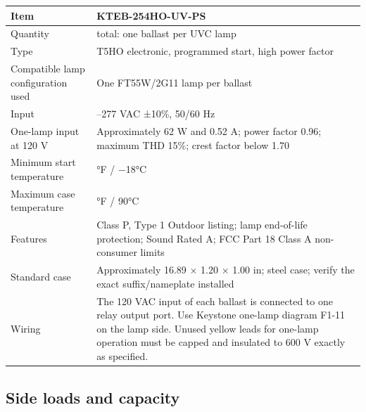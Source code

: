 \documentclass[
  10pt,
  letterpaper,
  openany]{report}
\newcounter{none} %
\begin{document}
{\def\LTcaptype{none} %
\begin{longtable}[]{@{}
  >{\raggedright\arraybackslash}p{}
  >{\raggedright\arraybackslash}p{}@{}}
\toprule\noalign{}
\begin{minipage}[b]{\linewidth}\raggedright
Item
\end{minipage} & \begin{minipage}[b]{\linewidth}\raggedright
KTEB-254HO-UV-PS
\end{minipage} \\
\midrule\noalign{}
\endhead
\bottomrule\noalign{}
\endlastfoot
Quantity & 4 total: one ballast per UVC lamp \\
Type & T5HO electronic, programmed start, high power factor \\
Compatible lamp configuration used & One FT55W/2G11 lamp per ballast \\
Input & 120--277 VAC ±10\%, 50/60 Hz \\
One-lamp input at 120 V & Approximately 62 W and 0.52 A; power factor
0.96; maximum THD 15\%; crest factor below 1.70 \\
Minimum start temperature & 0°F / −18°C \\
Maximum case temperature & 194°F / 90°C \\
Features & Class P, Type 1 Outdoor listing; lamp end-of-life protection;
Sound Rated A; FCC Part 18 Class A non-consumer limits \\
Standard case & Approximately 16.89 × 1.20 × 1.00 in; steel case; verify
the exact suffix/nameplate installed \\
Wiring & The 120 VAC input of each ballast is connected to one relay
output port. Use Keystone one-lamp diagram F1-11 on the lamp side.
Unused yellow leads for one-lamp operation must be capped and insulated
to 600 V exactly as specified. \\
\end{longtable}
}

\subsection{Side loads and capacity}\label{side-loads-and-capacity}
\end{document}

